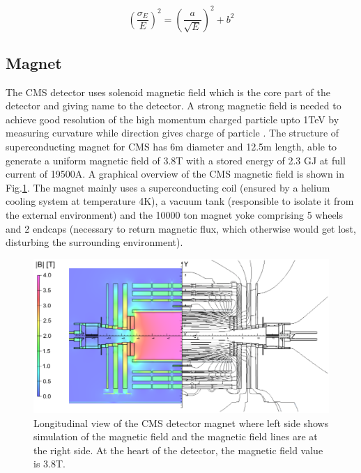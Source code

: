 \begin{equation}
(\frac{\sigma_{E}}{E})^{2} = (\frac{a}{\sqrt{E}})^{2} + b^{2}
\end{equation}
\subsection{Magnet}
The CMS detector uses solenoid magnetic field which is the core part of the detector and giving name to the detector. A strong magnetic field is needed to achieve good resolution of the high momentum charged particle upto 1TeV by measuring curvature while direction gives charge of particle \cite{cms_magnet}. The structure of superconducting magnet for CMS  has 6m diameter and 12.5m length, able to generate a uniform magnetic field of 3.8T with a stored energy of 2.3 GJ at full current of 19500A. A graphical overview of the CMS magnetic field is shown in Fig.\ref{fig:magnet}. The magnet mainly uses a superconducting coil (ensured by a helium cooling system at temperature 4K), a vacuum tank (responsible to isolate it from the external environment) and the 10000 ton magnet yoke comprising 5 wheels and 2 endcaps (necessary to return magnetic flux, which otherwise would get lost, disturbing the surrounding environment). 
\begin{figure}[h]
\centering
\includegraphics[scale=0.4]{fig/chapt3/Sections_IntroductionFigs_MagField.png}
\caption{\label{fig:magnet} Longitudinal view of the CMS detector magnet where left side shows simulation of the magnetic field and the magnetic field lines are at the right side. At the heart of the detector, the magnetic field value is 3.8T.}
\end{figure}
